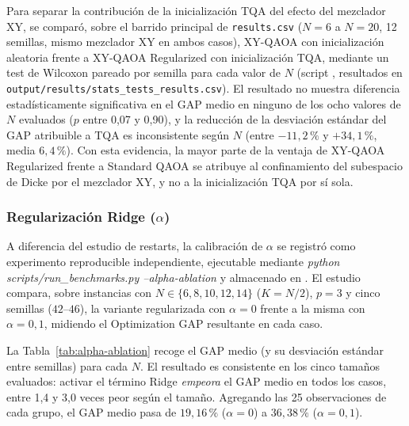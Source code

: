 Para separar la contribución de la inicialización TQA del efecto del mezclador XY, se comparó, sobre
el barrido principal de \texttt{results.csv} ($N=6$ a $N=20$, 12 semillas, mismo mezclador XY en
ambos casos), XY-QAOA con inicialización aleatoria frente a XY-QAOA Regularized con inicialización
TQA, mediante un test de Wilcoxon pareado por semilla para cada valor de $N$
(script \texttt{}, resultados en
\texttt{output/results/stats\_tests\_results.csv}). El resultado no muestra diferencia
estadísticamente significativa en el GAP medio en ninguno de los ocho valores de $N$ evaluados ($p$
entre 0,07 y 0,90), y la reducción de la desviación estándar del GAP atribuible a TQA es
inconsistente según $N$ (entre $-11{,}2\,\%$ y $+34{,}1\,\%$, media $6{,}4\,\%$). Con esta evidencia,
la mayor parte de la ventaja de XY-QAOA Regularized frente a Standard QAOA se atribuye al
confinamiento del subespacio de Dicke por el mezclador XY, y no a la inicialización TQA por sí sola.

\subsubsection{Regularización Ridge ($\alpha$)}
\label{subsubsec:ridge-ablation}

A diferencia del estudio de restarts, la calibración de $\alpha$ se registró como experimento reproducible independiente, ejecutable mediante \textit{python scripts/run\_benchmarks.py --alpha-ablation} y almacenado en \textit{}. El estudio compara, sobre instancias con $N \in \{6, 8, 10, 12, 14\}$ ($K=N/2$), $p=3$ y cinco semillas ($42$--$46$), la variante regularizada con $\alpha=0$ frente a la misma con $\alpha=0{,}1$, midiendo el Optimization GAP resultante en cada caso.

La Tabla~\ref{tab:alpha-ablation} recoge el GAP medio (y su desviación estándar entre semillas) para cada $N$. El resultado es consistente en los cinco tamaños evaluados: activar el término Ridge \emph{empeora} el GAP medio en todos los casos, entre 1,4 y 3,0 veces peor según el tamaño. Agregando las 25 observaciones de cada grupo, el GAP medio pasa de $19{,}16\,\%$ ($\alpha=0$) a $36{,}38\,\%$ ($\alpha=0{,}1$).

